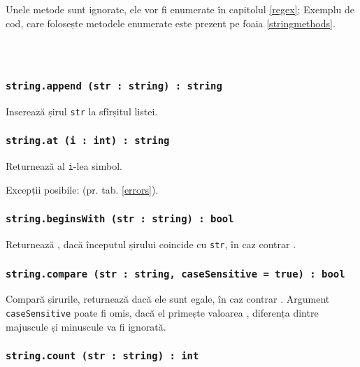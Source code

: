 Unele metode sunt ignorate, ele vor fi enumerate în capitolul \ref{regex}; Exemplu de cod, care folosește metodele enumerate este prezent pe foaia \ref{stringmethods}.

\

\begin{sourcecode}
\label{stringmethods}
\inputminted[linenos]{icl}{../sources/stringmethods.icL}
\end{sourcecode}

\subsubsection{\texttt{string.append (str : string) : string}}

Inserează șirul \texttt{str} la sfîrșitul listei.

\subsubsection{\texttt{string.at (i : int) : string}}

Returnează al \texttt{i}-lea simbol.

Excepții posibile:  (pr. tab. \ref{errors}).

\subsubsection{\texttt{string.beginsWith (str : string) : bool}}

Returnează \true{}, dacă începutul șirului coincide cu \texttt{str}, în caz contrar \false{}.

\subsubsection{\texttt{string.compare (str : string, caseSensitive = true) : bool}}

Compară șirurile, returnează \true{} dacă ele sunt egale, în caz contrar \false{}. Argument \texttt{caseSensitive} poate fi omis, dacă el primește valoarea \false{}, diferența dintre majuscule și minuscule va fi ignorată.

\subsubsection{\texttt{string.count (str : string) : int}}

